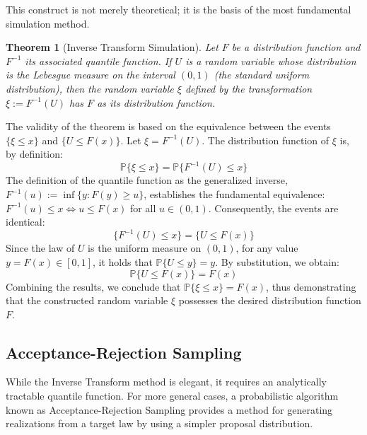 \documentclass[12pt, openany]{book}
\theoremstyle{definition}
\theoremstyle{plain}
\newtheorem{theorem}[definition]{Theorem}
\theoremstyle{remark}
\newcommand{\probP}{\mathbb{P}}
\begin{document}
This construct is not merely theoretical; it is the basis of the most fundamental simulation method.

\begin{theorem}[Inverse Transform Simulation]
Let $F$ be a distribution function and $F^{-1}$ its associated quantile function. If $U$ is a random variable whose distribution is the Lebesgue measure on the interval $(0,1)$ (the standard uniform distribution), then the random variable $\xi$ defined by the transformation $\xi := F^{-1}(U)$ has $F$ as its distribution function.
\end{theorem}

\vspace{1em}
The validity of the theorem is based on the equivalence between the events $\{\xi \le x\}$ and $\{U \le F(x)\}$. Let $\xi = F^{-1}(U)$. The distribution function of $\xi$ is, by definition:
$$ \probP\{\xi \le x\} = \probP\{F^{-1}(U) \le x\} $$
The definition of the quantile function as the generalized inverse, $F^{-1}(u) := \inf\{y : F(y) \ge u\}$, establishes the fundamental equivalence: $F^{-1}(u) \le x \iff u \le F(x)$ for all $u \in (0,1)$. Consequently, the events are identical:
$$ \{F^{-1}(U) \le x\} = \{U \le F(x)\} $$
Since the law of $U$ is the uniform measure on $(0,1)$, for any value $y = F(x) \in [0,1]$, it holds that $\probP\{U \le y\} = y$. By substitution, we obtain:
$$ \probP\{U \le F(x)\} = F(x) $$
Combining the results, we conclude that $\probP\{\xi \le x\} = F(x)$, thus demonstrating that the constructed random variable $\xi$ possesses the desired distribution function $F$.

\subsection{Acceptance-Rejection Sampling}

While the Inverse Transform method is elegant, it requires an analytically tractable quantile function. For more general cases, a probabilistic algorithm known as Acceptance-Rejection Sampling provides a method for generating realizations from a target law by using a simpler proposal distribution.
\end{document}
